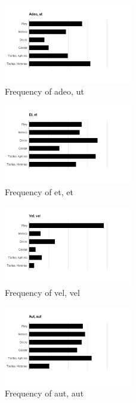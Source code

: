 \documentclass[11pt,twocolumn]{article}
\begin{document}
\begin{figure}
\includegraphics[width=0.5\textwidth]{adeout.png}
\caption{\label{fig:au}Frequency of adeo, ut}
\end{figure}

\begin{figure}
\includegraphics[width=0.5\textwidth]{etet.png}
\caption{\label{fig:ee}Frequency of et, et}
\end{figure}

\begin{figure}
\includegraphics[width=0.5\textwidth]{velvel.png}
\caption{\label{fig:vv}Frequency of vel, vel}
\end{figure}

\begin{figure}
\includegraphics[width=0.5\textwidth]{autaut.png}
\caption{\label{fig:ge}\label{fig:aa}Frequency of aut, aut}
\end{figure}
\end{document}
